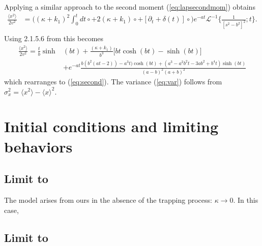\documentclass[]{agujournal2018}
\newcommand\bra{\langle}
\newcommand\ket{\rangle}
\newcommand\El{\mathcal{L}}
\begin{document}
Applying a similar approach to the second moment (\ref{eq:lapsecondmom}) obtains
\begin{align}
\frac{\bra x^2 \ket}{2v^2} 
&= \Big((\kappa+k_1)^2\int_0^t dt \circ + 2(\kappa + k_1)\circ +  [\partial_t + \delta(t)]\circ \Big)e^{-at}\El^{-1}\Big\{\frac{1}{[s^2-b^2]^2};t\Big\}.\\
\end{align}
Using 2.1.5.6 from \citet{Prudnikov1992a} this becomes
\begin{align}
\frac{\bra x^2 \ket}{2v^2} = \frac{t}{b}\sinh&(bt) + \frac{(\kappa + k_1)}{b^3}\big[bt\cosh(bt)-\sinh(bt)\big]\\
&+e^{-at}\frac{b(b^2(at-2))-a^3t)\cosh(bt) +(a^3-a^2b^2t-3ab^2+b^4t)\sinh(bt)}{(a-b)^2(a+b)^2}
\end{align}
which rearranges to (\ref{eq:second}).
The variance (\ref{eq:var}) follows from $\sigma_x^2 = \bra x^2 \ket - \bra x \ket^2.$

\section{Initial conditions and limiting behaviors}
\label{sec:appendixC}
\subsection{Limit to \citet{Lisle1998}}
The \citet{Lisle1998} model arises from ours in the absence of the trapping process: $\kappa \rightarrow 0$.
In this case, 
\subsection{Limit to \citet{Einstein1937}}
\end{document}
